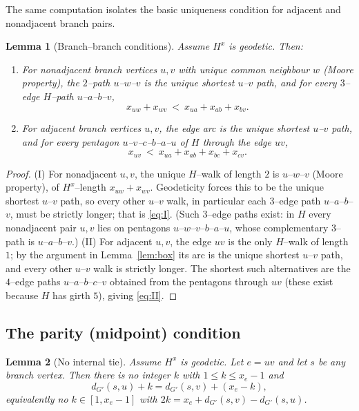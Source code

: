 \documentclass{amsart}
\theoremstyle{plain}
\newtheorem{lemma}{Lemma}
\theoremstyle{definition}
\newcommand{\dG}{d_{G'}}
\begin{document}
The same computation isolates the basic uniqueness condition for adjacent and
nonadjacent branch pairs.

\begin{lemma}[Branch--branch conditions]\label{lem:bb}
Assume $H^x$ is geodetic. Then:
\begin{enumerate}
\item[(I)] For nonadjacent branch vertices $u,v$ with unique common neighbour $w$
(Moore property), the $2$--path $u$--$w$--$v$ is the unique shortest $u$--$v$ path,
and for every $3$--edge $H$--path $u$--$a$--$b$--$v$,
\begin{equation}\label{eq:I}
x_{uw}+x_{wv}\ <\ x_{ua}+x_{ab}+x_{bv}.
\end{equation}
\item[(II)] For adjacent branch vertices $u,v$, the edge arc is the unique shortest
$u$--$v$ path, and for every pentagon $u$--$v$--$c$--$b$--$a$--$u$ of $H$ through the
edge $uv$,
\begin{equation}\label{eq:II}
x_{uv}\ <\ x_{ua}+x_{ab}+x_{bc}+x_{cv}.
\end{equation}
\end{enumerate}
\end{lemma}

\begin{proof}
(I) For nonadjacent $u,v$, the unique $H$--walk of length $2$ is $u$--$w$--$v$
(Moore property), of $H^x$--length $x_{uw}+x_{wv}$. Geodeticity forces this to be
the unique shortest $u$--$v$ path, so every other $u$--$v$ walk, in particular each
$3$--edge path $u$--$a$--$b$--$v$, must be strictly longer; that is \eqref{eq:I}.
(Such $3$--edge paths exist: in $H$ every nonadjacent pair $u,v$ lies on pentagons
$u$--$w$--$v$--$b$--$a$--$u$, whose complementary $3$--path is $u$--$a$--$b$--$v$.)
(II) For adjacent $u,v$, the edge $uv$ is the only $H$--walk of length $1$; by the
argument in Lemma~\ref{lem:box} its arc is the unique shortest $u$--$v$ path, and
every other $u$--$v$ walk is strictly longer. The shortest such alternatives are the
$4$--edge paths $u$--$a$--$b$--$c$--$v$ obtained from the pentagons through $uv$
(these exist because $H$ has girth $5$), giving \eqref{eq:II}.
\end{proof}

\subsection{The parity (midpoint) condition}

\begin{lemma}[No internal tie]\label{lem:III}
Assume $H^x$ is geodetic. Let $e=uv$ and let $s$ be any branch vertex. Then there is
no integer $k$ with $1\le k\le x_e-1$ and
\begin{equation}\label{eq:tie}
\dG(s,u)+k=\dG(s,v)+(x_e-k),
\end{equation}
equivalently no $k\in[1,x_e-1]$ with $2k=x_e+\dG(s,v)-\dG(s,u)$.
\end{lemma}
\end{document}
